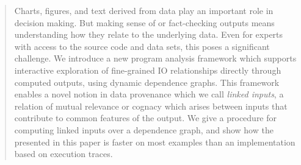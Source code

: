 \begin{abstract}
Charts, figures, and text derived from data play an important role in decision making. But making sense of or
fact-checking outputs means understanding how they relate to the underlying data. Even for experts with access
to the source code and data sets, this poses a significant challenge. We introduce a new program analysis
framework which supports interactive exploration of fine-grained IO relationships directly through computed
outputs, using dynamic dependence graphs. This framework enables a novel notion in data provenance which we
call \emph{linked inputs}, a relation of mutual relevance or cognacy which arises between inputs that
contribute to common features of the output. We give a procedure for computing linked inputs over a dependence
graph, and show how the presented in this paper is faster on most examples than an implementation based on
execution traces.
\end{abstract}

